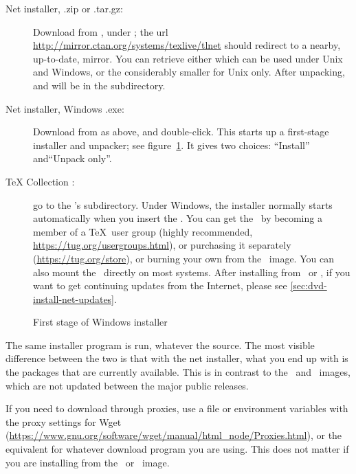 \documentclass{article}
\begin{document}
\begin{description}
\item [Net installer, .zip or .tar.gz:] Download from \CTAN, under
; the url
\url{http://mirror.ctan.org/systems/texlive/tlnet} should redirect to a
nearby, up-to-date, mirror.  You can retrieve either
 which can be used under Unix and Windows, or
the considerably smaller  for Unix
only. After unpacking,  and
 will be in the 
subdirectory.

\item[Net installer, Windows .exe:] Download from \CTAN{} as above,
and double-click. This starts up a first-stage installer and unpacker;
see figure~\ref{fig:nsis}. It gives two choices: ``Install''
and``Unpack only''.

\item [\TeX{} Collection \DVD:] go to the \DVD's 
subdirectory. Under Windows, the installer normally starts automatically
when you insert the \DVD.  You can get the \DVD\ by becoming a member of
a \TeX\ user group (highly recommended,
\url{https://tug.org/usergroups.html}), or purchasing it separately
(\url{https://tug.org/store}), or burning your own from the \ISO\ image.
You can also mount the \ISO\ directly on most systems.  After installing
from \DVD\ or \ISO, if you want to get continuing updates from the
Internet, please see \ref{sec:dvd-install-net-updates}.

\end{description}

\begin{figure}[tb]
\caption{First stage of Windows  installer}\label{fig:nsis}
\end{figure}

The same installer program is run, whatever the source.  The most
visible difference between the two is that with the net installer, what
you end up with is the packages that are currently available.  This is
in contrast to the \DVD\ and \ISO\ images, which are not updated between
the major public releases.

If you need to download through proxies, use a  file
or environment variables with the proxy settings for Wget
(\url{https://www.gnu.org/software/wget/manual/html_node/Proxies.html}),
or the equivalent for whatever download program you are using. This does
not matter if you are installing from the \DVD\ or \ISO\ image.
\end{document}
